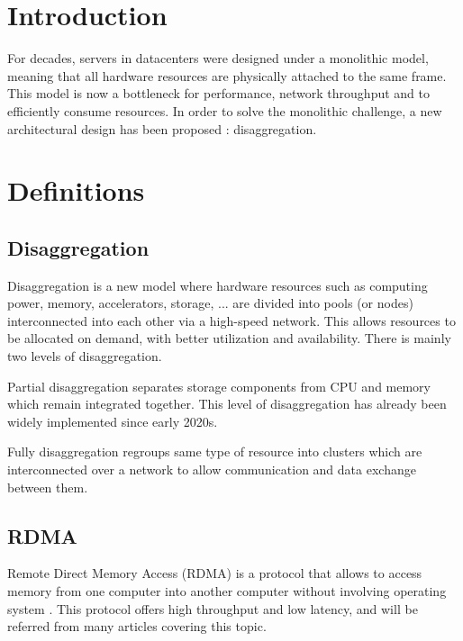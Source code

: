 \documentclass[11pt, a4paper]{article}
\begin{document}
\maketitle

\section{Introduction}

For decades, servers in datacenters were designed under a monolithic model, meaning that all hardware resources are physically
attached to the same frame. This model is now a bottleneck for performance, network throughput and to efficiently consume resources.
In order to solve the monolithic challenge, a new architectural design has been proposed : disaggregation.

\section{Definitions}

\subsection{Disaggregation}

Disaggregation is a new model where hardware resources such as computing power, memory, accelerators, storage, ... are divided
into pools (or nodes) interconnected into each other via a high-speed network. This allows resources to be allocated on demand,
with better utilization and availability. There is mainly two levels of disaggregation.

Partial disaggregation separates storage components from CPU and memory which remain integrated together. This level of
disaggregation has already been widely implemented since early 2020s.

Fully disaggregation regroups same type of resource into clusters which are interconnected over a network to allow
communication and data exchange between them. \cite{lin_disaggregated_2020}

\subsection{RDMA}

Remote Direct Memory Access (RDMA) is a protocol that allows to access memory from one computer into another computer without
involving operating system \cite{recio_remote_2007}. This protocol offers high throughput and low latency, and will be referred from many articles
covering this topic.
\end{document}

